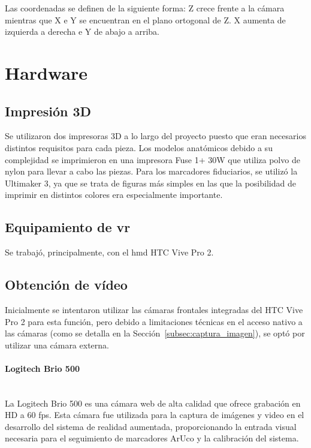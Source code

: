 Las coordenadas se definen de la siguiente forma: Z crece frente a la cámara mientras que X e Y se encuentran en el plano ortogonal de Z. X aumenta de izquierda a derecha e Y de abajo a arriba.







\section{Hardware}
\subsection{Impresión 3D}
Se utilizaron dos impresoras 3D a lo largo del proyecto puesto que eran necesarios distintos requisitos para cada pieza.
Los modelos anatómicos debido a su complejidad se imprimieron en una impresora Fuse 1+ 30W que utiliza polvo de nylon para llevar a cabo las piezas.
Para los marcadores fiduciarios, se utilizó la Ultimaker 3, ya que se trata de figuras más simples en las que la posibilidad de imprimir en distintos colores era especialmente importante.

\subsection{Equipamiento de \gls{vr}}
Se trabajó, principalmente, con el \acrshort{hmd} HTC Vive Pro 2.

\subsection{Obtención de vídeo}
Inicialmente se intentaron utilizar las cámaras frontales integradas del HTC Vive Pro 2 para esta función, pero debido a limitaciones técnicas en el acceso nativo a las cámaras (como se detalla en la Sección~\ref{subsec:captura_imagen}), se optó por utilizar una cámara externa.

\paragraph{Logitech Brio 500}~\\
La Logitech Brio 500 es una cámara web de alta calidad que ofrece grabación en HD a 60 fps. Esta cámara fue utilizada para la captura de imágenes y video en el desarrollo del sistema de realidad aumentada, proporcionando la entrada visual necesaria para el seguimiento de marcadores ArUco y la calibración del sistema. 



